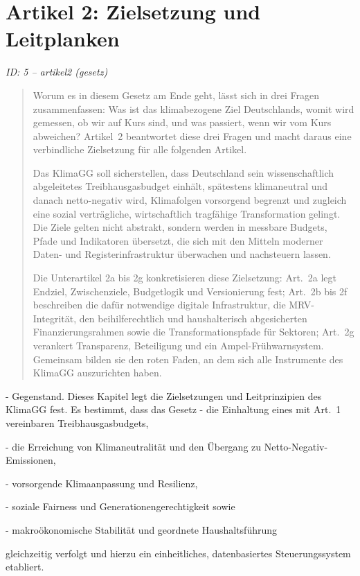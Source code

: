 \documentclass[12pt,a4paper]{scrartcl}
\begin{document}
\section[Artikel 2: Zielsetzung und Leitplanken]{Artikel 2: Zielsetzung und Leitplanken}
\noindent\textit{ID: 5 -- artikel2 (gesetz)}

\begin{quote}
Worum es in diesem Gesetz am Ende geht, lässt sich in drei Fragen zusammenfassen: Was ist das klimabezogene Ziel Deutschlands, womit wird gemessen, ob wir auf Kurs sind, und was passiert, wenn wir vom Kurs abweichen? Artikel 2 beantwortet diese drei Fragen und macht daraus eine verbindliche Zielsetzung für alle folgenden Artikel.

Das KlimaGG soll sicherstellen, dass Deutschland sein wissenschaftlich abgeleitetes Treibhausgasbudget einhält, spätestens klimaneutral und danach netto-negativ wird, Klimafolgen vorsorgend begrenzt und zugleich eine sozial verträgliche, wirtschaftlich tragfähige Transformation gelingt. Die Ziele gelten nicht abstrakt, sondern werden in messbare Budgets, Pfade und Indikatoren übersetzt, die sich mit den Mitteln moderner Daten- und Registerinfrastruktur überwachen und nachsteuern lassen.

Die Unterartikel 2a bis 2g konkretisieren diese Zielsetzung: Art. 2a legt Endziel, Zwischenziele, Budgetlogik und Versionierung fest; Art. 2b bis 2f beschreiben die dafür notwendige digitale Infrastruktur, die MRV-Integrität, den beihilferechtlich und haushalterisch abgesicherten Finanzierungsrahmen sowie die Transformationspfade für Sektoren; Art. 2g verankert Transparenz, Beteiligung und ein Ampel-Frühwarnsystem. Gemeinsam bilden sie den roten Faden, an dem sich alle Instrumente des KlimaGG auszurichten haben.
\end{quote}

- Gegenstand. Dieses Kapitel legt die Zielsetzungen und Leitprinzipien des KlimaGG fest. Es bestimmt, dass das Gesetz
- die Einhaltung eines mit Art. 1 vereinbaren Treibhausgasbudgets,

- die Erreichung von Klimaneutralität und den Übergang zu Netto-Negativ-Emissionen,

- vorsorgende Klimaanpassung und Resilienz,

- soziale Fairness und Generationengerechtigkeit sowie

- makroökonomische Stabilität und geordnete Haushaltsführung

    gleichzeitig verfolgt und hierzu ein einheitliches, datenbasiertes Steuerungssystem etabliert.
\end{document}
